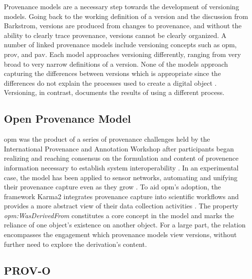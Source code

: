Provenance models are a necessary step towards the development of versioning models.
Going back to the working definition of a version and the discussion from Barkstrom, \glspl{version} are produced from changes to \gls{provenance}, and without the ability to clearly trace \gls{provenance}, \glspl{version} cannot be clearly organized.
A number of \gls{linked} \gls{provenance} models include versioning concepts such as \gls{opm}, \gls{prov}, and \gls{pav}.
Each model approaches versioning differently, ranging from very broad to very narrow definitions of a \gls{version}.
None of the models approach capturing the differences between \glspl{version} which is appropriate since the differences do not explain the processes used to create a digital object \cite{moreau2008open}.
Versioning, in contrast, documents the results of using a different process.

\subsection{Open Provenance Model}

\gls{opm} was the product of a series of provenance challenges held by the International Provenance and Annotation Workshop after participants began realizing and reaching consensus on the formulation and content of provenence information necessary to establish system interoperability \cite{moreau2008open}.
In an experimental case, the model has been applied to sensor networks, automating and unifying their provenance capture even as they grow \cite{5478496}.
To aid \gls{opm}'s adoption, the framework Karma2 integrates provenance capture into scientific workflows and provides a more abstract view of their data collection activities \cite{simmhan2010karma2}.
The property \textit{opm:WasDerivedFrom} constitutes a core concept in the model and marks the reliance of one object's existence on another object.
For a large part, the relation encompasses the engagement which provenance models view versions, without further need to explore the derivation's content.

\subsection{PROV-O}\label{sec:prov}

